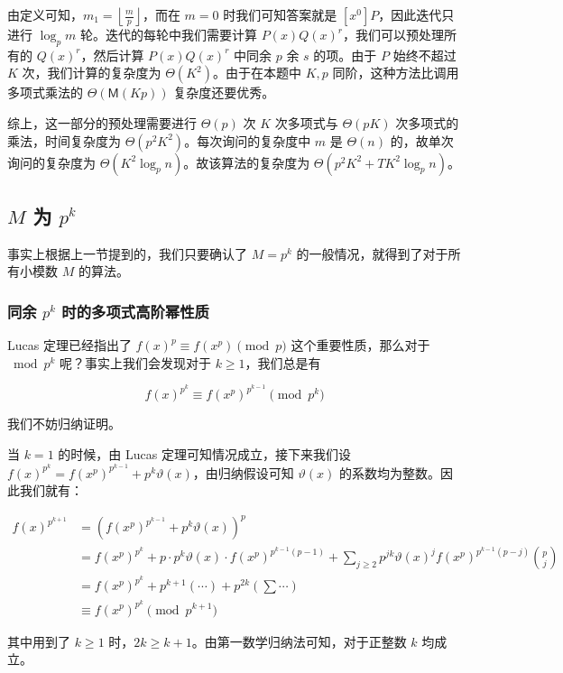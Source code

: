 \documentclass[12pt]{ctexart}
\newcommand{\Mul}{\ensuremath{\mathsf M}}
\theoremstyle{theorem}
\theoremstyle{theorem}
\begin{document}
由定义可知，$m_1 = \left\lfloor\frac mp\right\rfloor$，而在 $m=0$ 时我们可知答案就是 $[x^0]P$，因此迭代只进行 $\log_p m$ 轮。迭代的每轮中我们需要计算 $P(x)Q(x)^r$，我们可以预处理所有的 $Q(x)^r$，然后计算 $P(x)Q(x)^r$ 中同余 $p$ 余 $s$ 的项。由于 $P$ 始终不超过 $K$ 次，我们计算的复杂度为 $\Theta(K^2)$。由于在本题中 $K,p$ 同阶，这种方法比调用多项式乘法的 $\Theta(\Mul(Kp))$ 复杂度还要优秀。

综上，这一部分的预处理需要进行 $\Theta(p)$ 次 $K$ 次多项式与 $\Theta(pK)$ 次多项式的乘法，时间复杂度为 $\Theta(p^2K^2)$。每次询问的复杂度中 $m$ 是 $\Theta(n)$ 的，故单次询问的复杂度为 $\Theta(K^2\log_p n)$。故该算法的复杂度为 $\Theta(p^2K^2 + TK^2\log_p n)$。

\subsection{$M$ 为 $p^k$}

事实上根据上一节提到的，我们只要确认了 $M=p^k$ 的一般情况，就得到了对于所有小模数 $M$ 的算法。

\subsubsection{同余 $p^k$ 时的多项式高阶幂性质}

Lucas 定理已经指出了 $f(x)^p\equiv f(x^p) \pmod p$ 这个重要性质，那么对于 $\bmod p^k$ 呢？事实上我们会发现对于 $k\ge 1$，我们总是有\label{pkpow}

$$
f(x)^{p^k} \equiv f(x^p)^{p^{k-1}} \pmod {p^k}
$$

我们不妨归纳证明。

当 $k=1$ 的时候，由 Lucas 定理可知情况成立，接下来我们设 $f(x)^{p^k} = f(x^p)^{p^{k-1}} + p^k \vartheta(x)$，由归纳假设可知 $\vartheta(x)$ 的系数均为整数。因此我们就有：

\begin{align*}
f(x)^{p^{k+1}} &= \left(f(x^p)^{p^{k-1}} + p^k \vartheta(x)\right)^p\\
 &= f(x^p)^{p^k} + p \cdot p^k \vartheta(x) \cdot f(x^p)^{p^{k-1}(p-1)} + \sum_{j\ge 2}  p^{jk} \vartheta(x)^j f(x^p)^{p^{k-1}(p-j)}\binom p j \\
 &= f(x^p)^{p^k} + p^{k+1} (\cdots) + p^{2k}\left(\sum \cdots\right)\\
 &\equiv f(x^p)^{p^k} \pmod {p^{k+1}}
\end{align*}

其中用到了 $k\ge 1$ 时，$2k\ge k+1$。由第一数学归纳法可知，对于正整数 $k$ 均成立。
\end{document}

